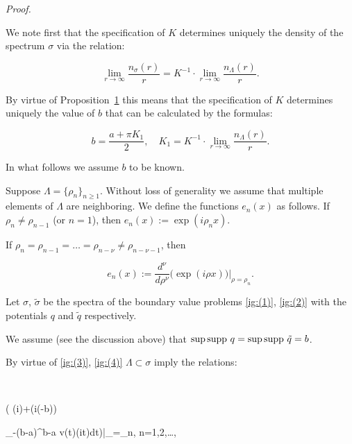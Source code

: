 \smallskip





\textit{Proof.}

We note first that the specification of $K$ determines uniquely the density of the spectrum $\sigma$ via the relation:

$$

\lim\limits_{r\to\infty}\frac{n_\sigma(r)}{r}=K^{-1}\cdot\lim\limits_{r\to\infty}\frac{n_\Lambda(r)}{r}.

$$

By virtue of Proposition~\hyperlink{ign:proposition1}{1} this means that the specification of $K$ determines uniquely the value of $b$ that can be calculated by the formulas:

\begin{equation}

b=\frac{a+\pi K_1}{2}, \quad  K_1=K^{-1}\cdot\lim\limits_{r\to\infty}\frac{n_\Lambda(r)}{r}. 

\label{ig:(5)}

\end{equation}

In what follows we assume $b$ to be known.



 Suppose $\Lambda=\{\rho_n\}_{n\geq 1}$. Without loss of generality we assume that multiple elements of $\Lambda$ are neighboring. We define the functions $e_n(x)$ as follows. If $\rho_n\neq \rho_{n-1}$ (or $n=1$), then $e_n(x):=\exp(i\rho_n x)$. 

 If $\rho_n=\rho_{n-1}=\dots=\rho_{n-\nu}\neq\rho_{n-\nu-1}$, then

$$

e_n(x):=\frac{d^\nu}{d\rho^\nu}\bigl(\exp(i\rho x)\bigr)\Bigr|_{\rho=\rho_n}.

$$

Let $\sigma$, $\tilde\sigma$ be the spectra of the boundary value problems \eqref{ig:(1)}, \eqref{ig:(2)}  with the potentials $q$ and $\tilde q$ respectively. 

We assume (see the discussion above) that $\sup  {\rm supp}\ q=\sup {\rm supp}\ \tilde q =b$. 

By virtue of \eqref{ig:(3)}, \eqref{ig:(4)}   $\Lambda\subset\sigma$ imply the relations:

$$


\biggl( \exp(i\rho \pi)+\exp\bigl(i\rho(\pi-b)\bigr)

\int_{-(b-a)}^{b-a} v(t)\exp(i\rho t)dt\biggr)\biggr|_{\rho=\rho_n}\!\!\!, \; \; n=1,2,\dots,

